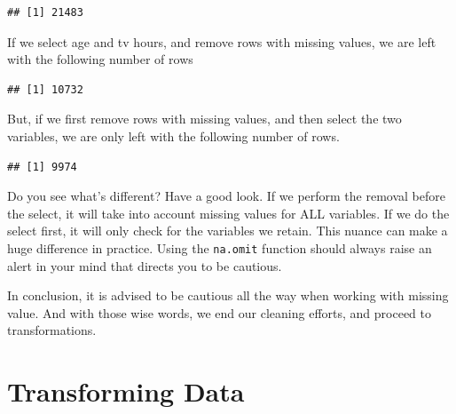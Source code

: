 \documentclass[]{tufte-book}
\newenvironment{Shaded}{}{}
\newcommand{\KeywordTok}[1]{\textcolor[rgb]{0.00,0.44,0.13}{\textbf{#1}}}
\newcommand{\NormalTok}[1]{#1}
\newcommand{\OperatorTok}[1]{\textcolor[rgb]{0.40,0.40,0.40}{#1}}
\newcommand{\StringTok}[1]{\textcolor[rgb]{0.25,0.44,0.63}{#1}}
\begin{document}
\begin{verbatim}
## [1] 21483
\end{verbatim}

If we select age and tv hours, and remove rows with missing values, we are left with the following number of rows

\begin{Shaded}
\end{Shaded}

\begin{verbatim}
## [1] 10732
\end{verbatim}

But, if we first remove rows with missing values, and then select the two variables, we are only left with the following number of rows.

\begin{Shaded}
\end{Shaded}

\begin{verbatim}
## [1] 9974
\end{verbatim}

Do you see what's different? Have a good look. If we perform the removal before the select, it will take into account missing values for ALL variables. If we do the select first, it will only check for the variables we retain. This nuance can make a huge difference in practice. Using the \texttt{na.omit} function should always raise an alert in your mind that directs you to be cautious.

In conclusion, it is advised to be cautious all the way when working with missing value. And with those wise words, we end our cleaning efforts, and proceed to transformations.

\hypertarget{transforming-data}{%
\section{Transforming Data}\label{transforming-data}}
\end{document}
